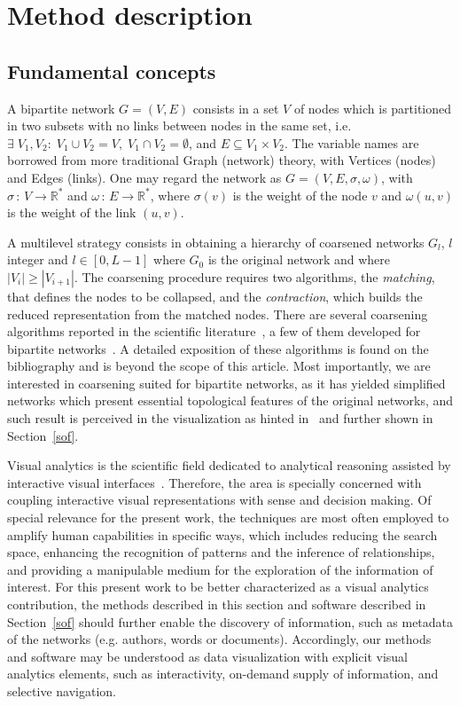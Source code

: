 \documentclass[runningheads]{llncs}
\begin{document}
\section{Method description}\label{des}
\subsection{Fundamental concepts}
A bipartite network $G=(V,E)$ consists in a set $V$ of nodes which is partitioned in two subsets
with no links between nodes in the same set, i.e. $\exists\; V_1, V_2:\; V_1\cup V_2 = V,\;V_1\cap V_2 = \emptyset$, and $E\subseteq V_1 \times V_2$.
The variable names are borrowed from more traditional
Graph (network) theory, with Vertices (nodes) and Edges (links).
One may regard the network as $G=(V,E,\sigma,\omega)$, with
$\sigma\,:\,V\rightarrow \mathbb{R}^*$ and $\omega\,:\,E \rightarrow \mathbb{R}^*$,
where $\sigma(v)$ is the weight of the node $v$ and
$\omega(u,v)$ is the weight of the link $(u,v)$.

A multilevel strategy consists in obtaining a hierarchy of coarsened networks $G_l$, $l$ integer and $l \in [0,L-1]$ where $G_0$ is the original network
and where $|V_i| \geq |V_{i+1}|$.
The coarsening procedure requires two algorithms, the \emph{matching}, that defines the nodes to be collapsed, and the \emph{contraction}, which builds the reduced representation
from the matched nodes.
There are several coarsening algorithms reported in the scientific literature~\cite{co1,co2}, a few of them
developed for bipartite networks~\cite{alan2}.
A detailed exposition of these algorithms is found on the bibliography and is beyond the scope of this article.
Most importantly, we are interested in coarsening suited for bipartite networks,
as it has yielded simplified networks which present essential topological features
of the original networks,
and such result is perceived in the visualization as hinted in~\cite{alan2} and further shown in
Section~\ref{sof}.

Visual analytics is the scientific field dedicated to analytical reasoning assisted by interactive visual interfaces~\cite{visAn}.
Therefore, the area is specially concerned with coupling interactive visual representations with sense and decision making.
Of special relevance for the present work, the techniques are most often employed to amplify human capabilities in specific ways,
which includes reducing the search space, enhancing the recognition of patterns and the inference of relationships,
and providing a manipulable medium for the exploration of the information of interest.
For this present work to be better characterized as a visual analytics contribution, the methods described in this section and software described in Section~\ref{sof} should further enable the discovery of information, such as metadata of the networks (e.g. authors, words or documents).
Accordingly, our methods and software may be understood as data visualization with explicit visual analytics elements, such as interactivity, on-demand supply of information, and selective navigation.
\end{document}
